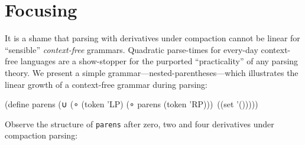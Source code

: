 \section{Focusing}

It is a shame that parsing with derivatives under compaction cannot be linear
for ``sensible'' \emph{context-free} grammars.
%
Quadratic parse-times for every-day context-free languages are a show-stopper
for the purported ``practicality'' of any parsing theory.
%
We present a simple grammar---nested-parentheses---which illustrates the linear
growth of a context-free grammar during parsing:
%
\begin{code}
(define parens (∪ (∘ (token 'LP) (∘ parens (token 'RP)))
                  \,(\ttepsilon (set '()))))
\end{code}

Observe the structure of {\tt parens} after zero, two and four derivatives under
compaction parsing:
%
